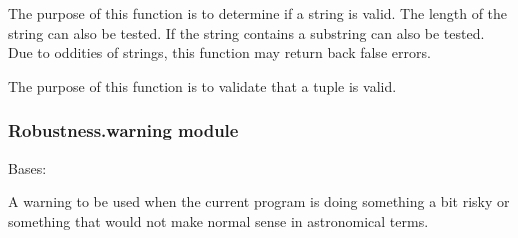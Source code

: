 \documentclass[letterpaper,10pt,english]{sphinxmanual}
\begin{document}
\begin{fulllineitems}
\label{\detokenize{Robustness.validation:Robustness.validation.validate_string}}
The purpose of this function is to determine if a string is valid. The
length of the string can also be tested. If the string contains a substring
can also be tested. Due to oddities of strings, this function may return
back false errors.

\end{fulllineitems}


\begin{fulllineitems}
\label{\detokenize{Robustness.validation:Robustness.validation.validate_tuple}}
The purpose of this function is to validate that a tuple is valid.

\end{fulllineitems}



\subsubsection{Robustness.warning module}
\label{\detokenize{Robustness.warning:module-Robustness.warning}}\label{\detokenize{Robustness.warning:robustness-warning-module}}\label{\detokenize{Robustness.warning::doc}}

\begin{fulllineitems}
\label{\detokenize{Robustness.warning:Robustness.warning.AstronomyWarning}}
Bases: {\hyperref[\detokenize{Robustness.warning:Robustness.warning.PhysicalityWarning}]{}}

A warning to be used when the current program is doing something a bit
risky or something that would not make normal sense in astronomical terms.

\end{fulllineitems}
\end{document}
